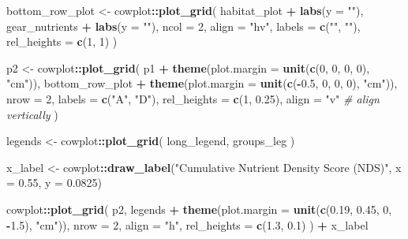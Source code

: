 \documentclass[
]{book}
\newenvironment{Shaded}{\begin{snugshade}}{\end{snugshade}}
\newcommand{\AttributeTok}[1]{\textcolor[rgb]{0.13,0.29,0.53}{#1}}
\newcommand{\CommentTok}[1]{\textcolor[rgb]{0.56,0.35,0.01}{\textit{#1}}}
\newcommand{\DecValTok}[1]{\textcolor[rgb]{0.00,0.00,0.81}{#1}}
\newcommand{\FloatTok}[1]{\textcolor[rgb]{0.00,0.00,0.81}{#1}}
\newcommand{\FunctionTok}[1]{\textcolor[rgb]{0.13,0.29,0.53}{\textbf{#1}}}
\newcommand{\NormalTok}[1]{#1}
\newcommand{\OtherTok}[1]{\textcolor[rgb]{0.56,0.35,0.01}{#1}}
\newcommand{\SpecialCharTok}[1]{\textcolor[rgb]{0.81,0.36,0.00}{\textbf{#1}}}
\newcommand{\StringTok}[1]{\textcolor[rgb]{0.31,0.60,0.02}{#1}}
\begin{document}
\begin{Shaded}
\begin{Highlighting}[]
\NormalTok{bottom\_row\_plot }\OtherTok{\textless{}{-}}\NormalTok{ cowplot}\SpecialCharTok{::}\FunctionTok{plot\_grid}\NormalTok{(}
\NormalTok{  habitat\_plot }\SpecialCharTok{+} \FunctionTok{labs}\NormalTok{(}\AttributeTok{y =} \StringTok{""}\NormalTok{),}
\NormalTok{  gear\_nutrients }\SpecialCharTok{+} \FunctionTok{labs}\NormalTok{(}\AttributeTok{y =} \StringTok{""}\NormalTok{),}
  \AttributeTok{ncol =} \DecValTok{2}\NormalTok{,}
  \AttributeTok{align =} \StringTok{"hv"}\NormalTok{,}
  \AttributeTok{labels =} \FunctionTok{c}\NormalTok{(}\StringTok{""}\NormalTok{, }\StringTok{""}\NormalTok{),}
  \AttributeTok{rel\_heights =} \FunctionTok{c}\NormalTok{(}\DecValTok{1}\NormalTok{, }\DecValTok{1}\NormalTok{)}
\NormalTok{)}

\NormalTok{p2 }\OtherTok{\textless{}{-}}\NormalTok{ cowplot}\SpecialCharTok{::}\FunctionTok{plot\_grid}\NormalTok{(}
\NormalTok{  p1 }\SpecialCharTok{+} \FunctionTok{theme}\NormalTok{(}\AttributeTok{plot.margin =} \FunctionTok{unit}\NormalTok{(}\FunctionTok{c}\NormalTok{(}\DecValTok{0}\NormalTok{, }\DecValTok{0}\NormalTok{, }\DecValTok{0}\NormalTok{, }\DecValTok{0}\NormalTok{), }\StringTok{"cm"}\NormalTok{)),}
\NormalTok{  bottom\_row\_plot }\SpecialCharTok{+} \FunctionTok{theme}\NormalTok{(}\AttributeTok{plot.margin =} \FunctionTok{unit}\NormalTok{(}\FunctionTok{c}\NormalTok{(}\SpecialCharTok{{-}}\FloatTok{0.5}\NormalTok{, }\DecValTok{0}\NormalTok{, }\DecValTok{0}\NormalTok{, }\DecValTok{0}\NormalTok{), }\StringTok{"cm"}\NormalTok{)),}
  \AttributeTok{nrow =} \DecValTok{2}\NormalTok{,}
  \AttributeTok{labels =} \FunctionTok{c}\NormalTok{(}\StringTok{"A"}\NormalTok{, }\StringTok{"D"}\NormalTok{),}
  \AttributeTok{rel\_heights =} \FunctionTok{c}\NormalTok{(}\DecValTok{1}\NormalTok{, }\FloatTok{0.25}\NormalTok{),}
  \AttributeTok{align =} \StringTok{"v"} \CommentTok{\# align vertically}
\NormalTok{)}

\NormalTok{legends }\OtherTok{\textless{}{-}}
\NormalTok{  cowplot}\SpecialCharTok{::}\FunctionTok{plot\_grid}\NormalTok{(}
\NormalTok{    long\_legend, groups\_leg}
\NormalTok{  )}

\NormalTok{x\_label }\OtherTok{\textless{}{-}}\NormalTok{ cowplot}\SpecialCharTok{::}\FunctionTok{draw\_label}\NormalTok{(}\StringTok{"Cumulative Nutrient Density Score (NDS)"}\NormalTok{, }\AttributeTok{x =} \FloatTok{0.55}\NormalTok{, }\AttributeTok{y =} \FloatTok{0.0825}\NormalTok{)}

\NormalTok{cowplot}\SpecialCharTok{::}\FunctionTok{plot\_grid}\NormalTok{(}
\NormalTok{  p2,}
\NormalTok{  legends }\SpecialCharTok{+} \FunctionTok{theme}\NormalTok{(}\AttributeTok{plot.margin =} \FunctionTok{unit}\NormalTok{(}\FunctionTok{c}\NormalTok{(}\FloatTok{0.19}\NormalTok{, }\FloatTok{0.45}\NormalTok{, }\DecValTok{0}\NormalTok{, }\SpecialCharTok{{-}}\FloatTok{1.5}\NormalTok{), }\StringTok{"cm"}\NormalTok{)),}
  \AttributeTok{nrow =} \DecValTok{2}\NormalTok{,}
  \AttributeTok{align =} \StringTok{"h"}\NormalTok{,}
  \AttributeTok{rel\_heights =} \FunctionTok{c}\NormalTok{(}\FloatTok{1.3}\NormalTok{, }\FloatTok{0.1}\NormalTok{)}
\NormalTok{) }\SpecialCharTok{+}
\NormalTok{  x\_label}
\end{Highlighting}
\end{Shaded}
\end{document}
